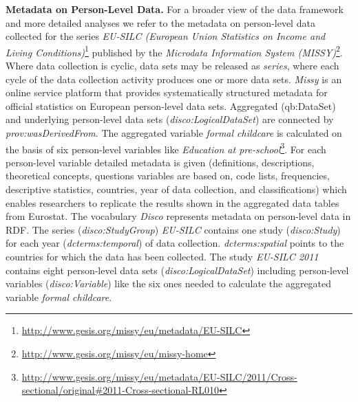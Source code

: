 \documentclass{llncs}
\begin{document}
\textbf{Metadata on Person-Level Data.}
For a broader view of the data framework and more detailed analyses we refer to the metadata on person-level data collected for the series \emph{EU-SILC (European Union Statistics on Income and Living Conditions)}\footnote{\url{http://www.gesis.org/missy/eu/metadata/EU-SILC}} 
published by the \emph{Microdata Information System (MISSY)}\footnote{\url{http://www.gesis.org/missy/eu/missy-home}}.
Where data collection is cyclic, data sets may be released as \emph{series}, 
where each cycle of the data collection activity produces one or more data sets. 
\emph{Missy} is an online service platform that provides systematically structured metadata for official statistics on European person-level data sets. 
Aggregated (qb:DataSet) and underlying person-level data sets (\emph{disco:LogicalDataSet}) are connected by \emph{prov:wasDerivedFrom}. 
The aggregated variable \emph{formal childcare} is calculated on the basis of six person-level variables like 
\emph{Education at pre-school}\footnote{\url{http://www.gesis.org/missy/eu/metadata/EU-SILC/2011/Cross-sectional/original#2011-Cross-sectional-RL010}}.
For each person-level variable detailed metadata is given (definitions, descriptions, theoretical concepts, questions variables are based on, code lists, frequencies, descriptive statistics, countries, year of data collection, and classifications) which enables researchers to replicate the results shown in the aggregated data tables from Eurostat.
The vocabulary \emph{Disco} represents metadata on person-level data in RDF.
The series (\emph{disco:StudyGroup}) \emph{EU-SILC} contains one study (\emph{disco:Study}) for each year (\emph{dcterms:temporal}) of data collection.   
\emph{dcterms:spatial} points to the countries for which the data has been collected.
The study \emph{EU-SILC 2011} contains eight person-level data sets (\emph{disco:LogicalDataSet})
including person-level variables (\emph{disco:Variable}) like the six ones needed to calculate the aggregated variable \emph{formal childcare}.
\end{document}

